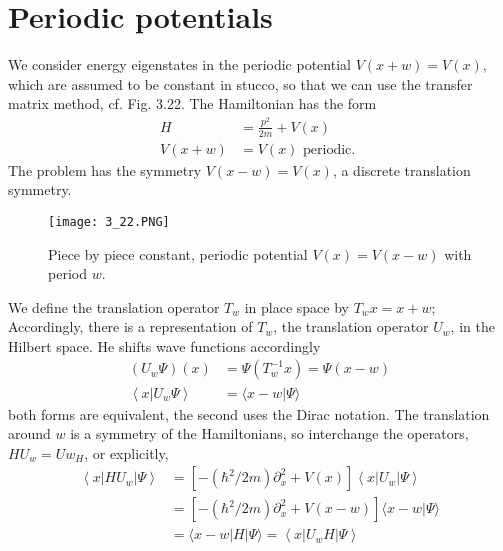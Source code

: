 \section{Periodic potentials}
We consider energy eigenstates in the periodic potential $V (x + w) = V (x)$, which are assumed to be constant in stucco, so that we can use the transfer matrix method, cf. Fig. 3.22. The Hamiltonian has the form
\begin{equation}
\begin{aligned} H &=\frac{p^{2}}{2 m}+V(x) \\ V(x+w) &=V(x) \text { periodic. } \end{aligned}
\end{equation}
The problem has the symmetry $V (x - w) = V (x)$, a discrete translation symmetry.
\begin{figure}[ht]
    \begin{minipage}{0.5\textwidth}
        \centering
        \texttt{[image: 3\_22.PNG]}
    \end{minipage}
    \begin{minipage}{0.5\textwidth}
        \caption{Piece by piece constant, periodic potential $V (x) = V (x - w)$ with period $w$.}
    \end{minipage}
\end{figure}
We define the translation operator $T_w$ in place space by $T_{w}x = x + w$; Accordingly, there is a representation of $T_w$, the translation operator $U_w$, in the Hilbert space. He shifts wave functions accordingly
\begin{equation}
\begin{aligned}\left(U_{w} \Psi\right)(x) &=\Psi\left(T_{w}^{-1} x\right)=\Psi(x-w) \\\left\langle x | U_{w} \Psi\right\rangle &=\langle x-w | \Psi\rangle \end{aligned}
\end{equation}
both forms are equivalent, the second uses the Dirac notation. The translation around $w$ is a symmetry of the Hamiltonians, so interchange the operators, $HU_w = Uw_H$, or explicitly,
\begin{equation}
\begin{aligned}\left\langle x\left|H U_{w}\right| \Psi\right\rangle &=\left[-\left(\hbar^{2} / 2 m\right) \partial_{x}^{2}+V(x)\right]\left\langle x\left|U_{w}\right| \Psi\right\rangle \\ &=\left[-\left(\hbar^{2} / 2 m\right) \partial_{x}^{2}+V(x-w)\right]\langle x-w | \Psi\rangle \\ &=\langle x-w|H| \Psi\rangle=\left\langle x\left|U_{w} H\right| \Psi\right\rangle \end{aligned}
\end{equation}
